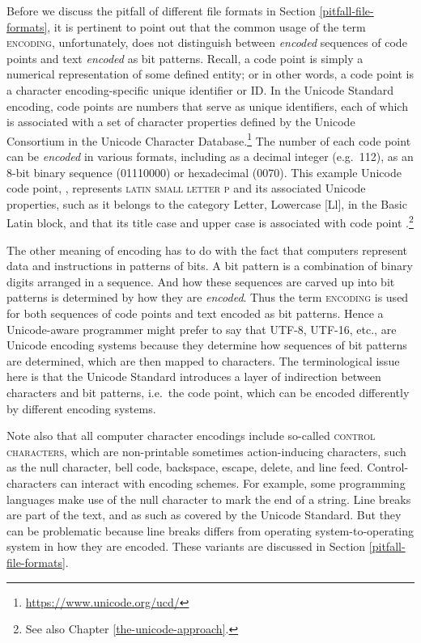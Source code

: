 Before we discuss the pitfall of different file formats in Section \ref{pitfall-file-formats}, it is pertinent to point out that the common usage of the term \textsc{encoding}, unfortunately, does not distinguish between \textit{encoded} sequences of code points and text \textit{encoded} as bit patterns. Recall, a code point is simply a numerical representation of some defined entity; or in other words, a code point is a character encoding-specific unique identifier or ID. In the Unicode Standard encoding, code points are numbers that serve as unique identifiers, each of which is associated with a set of character properties defined by the Unicode Consortium in the Unicode Character Database.\footnote{\url{https://www.unicode.org/ucd/}} The number of each code point can be \textit{encoded} in various formats, including as a decimal integer (e.g.\ 112), as an 8-bit binary sequence (01110000) or hexadecimal (0070). This example Unicode code point, , represents \textsc{latin small letter p} and its associated Unicode properties, such as it belongs to the category Letter, Lowercase [Ll], in the Basic Latin block, and that its title case and upper case is associated with code point .\footnote{See also Chapter \ref{the-unicode-approach}.}


The other meaning of encoding has to do with the fact that computers represent data and instructions in patterns of bits. A bit pattern is a combination of binary digits arranged in a sequence. And how these sequences are carved up into bit patterns is determined by how they are \textit{encoded}. Thus the term \textsc{encoding} is used for both sequences of code points and text encoded as bit patterns. Hence a Unicode-aware programmer might prefer to say that UTF-8, UTF-16, etc., are Unicode encoding systems because they determine how sequences of bit patterns are determined, which are then mapped to characters. The terminological issue here is that the Unicode Standard introduces a layer of indirection between characters and bit patterns, i.e.\ the code point, which can be encoded differently by different encoding systems.

Note also that all computer character encodings include so-called \textsc{control characters}, which are non-printable sometimes action-inducing characters, such as the null character, bell code, backspace, escape, delete, and line feed. Control-characters can interact with encoding schemes. For example, some programming languages make use of the null character to mark the end of a string. Line breaks are part of the text, and as such as covered by the Unicode Standard. But they can be problematic because line breaks differs from operating system-to-operating system in how they are encoded. These variants are discussed in Section \ref{pitfall-file-formats}.

